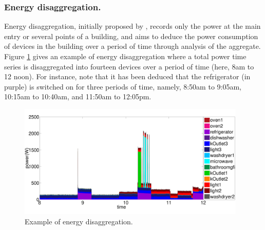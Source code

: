 

\subsubsection*{Energy disaggregation.}
Energy disaggregation, initially proposed by \cite{hart1992},
records only the power at the main entry or several points of a building,
and aims to deduce the power consumption of devices in the building over
a period of time through analysis of the aggregate.
Figure \ref{fig_energyDisaggDefinition} gives an example of energy disaggregation
where a total power time series is disaggregated into
fourteen devices over a period of time (here,
8am to 12 noon).
For instance, note that it has been deduced that the refrigerator (in purple)
is switched on for three periods of time, namely,
8:50am to 9:05am,
10:15am to 10:40am, and 11:50am to 12:05pm.

\begin{figure}[!hbp]
\centering
\includegraphics[width=0.97\textwidth]{disaggfigs/energyDisaggDefinition.pdf}
\caption{Example of energy disaggregation.}
\label{fig_energyDisaggDefinition}
\end{figure}


